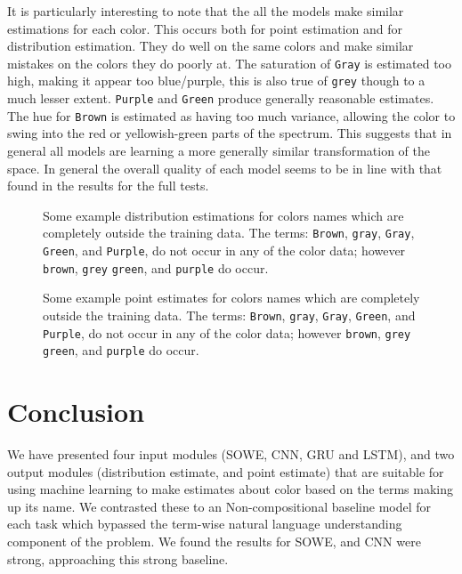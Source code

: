 \documentclass[]{clv3}
\newcommand{\natlang}[1]{\texttt{#1}}
\newcommand{\empmodel}{Non-compositional baseline} %
\begin{document}
It is particularly interesting to note that the all the models make similar estimations for each color.
This occurs both for point estimation and for distribution estimation.
They do well on the same colors and make similar mistakes on the colors they do poorly at.
The saturation of \natlang{Gray} is estimated too high, making it appear too blue/purple, this is also true of \natlang{grey} though to a much lesser extent.
\natlang{Purple} and \natlang{Green} produce generally reasonable estimates.
The hue for \natlang{Brown} is estimated as having too much variance, allowing the color to swing into the red or yellowish-green parts of the spectrum.
This suggests that in general all models are learning a more generally similar transformation of the space.
In general the overall quality of each model seems to be in line with that found in the results for the full tests.


\begin{figure}
	\caption{Some example distribution estimations for colors names which are completely outside the training data. The terms: \natlang{Brown}, \natlang{gray}, \natlang{Gray}, \natlang{Green}, and \natlang{Purple}, do not occur in any of the color data; however \natlang{brown}, \natlang{grey} \natlang{green}, and \natlang{purple} do occur.} \label{fig:oovdist}
\end{figure}

\begin{figure}
	\caption{Some example point estimates for colors names which are completely outside the training data. The terms: \natlang{Brown}, \natlang{gray}, \natlang{Gray}, \natlang{Green}, and \natlang{Purple}, do not occur in any of the color data; however \natlang{brown}, \natlang{grey} \natlang{green}, and \natlang{purple} do occur.} \label{fig:oovpoint}
\end{figure}



\section{Conclusion}
We have presented four input modules (SOWE, CNN, GRU and LSTM),
and two output modules (distribution estimate, and point estimate)
that are suitable for using machine learning to make estimates about color based on the terms making up its name.
We contrasted these to an \empmodel{} model for each task which bypassed the term-wise natural language understanding component of the problem.
We found the results for SOWE, and CNN were strong, approaching this strong baseline.
\end{document}
